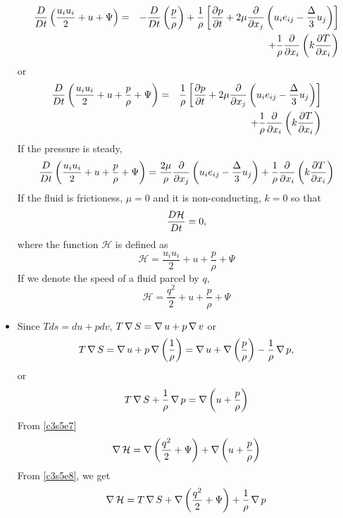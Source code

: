 \begin{itemize}
\begin{eqnarray*}
\frac{D}{Dt}\left(\frac{u_iu_i}{2} + u + \Psi\right) &=& 
-\frac{D}{Dt}\left(\frac{p}{\rho}\right) + \frac{1}{\rho}\left[\frac{\partial{p}}{\partial{t}} + 2\mu\frac{\partial}{\partial x_j}\left(u_ie_{ij} -\frac{\Delta}{3} u_j\right)\right] \\
 & & + \frac{1}{\rho}\frac{\partial}{\partial x_i}\left(k\frac{\partial{T}}{\partial{x_i}}\right)
\end{eqnarray*}
or
\begin{eqnarray*}
\frac{D}{Dt}\left(\frac{u_iu_i}{2} + u + \frac{p}{\rho} + \Psi\right) &=& 
\frac{1}{\rho}\left[\frac{\partial{p}}{\partial{t}} + 2\mu\frac{\partial}{\partial x_j}\left(u_ie_{ij} -\frac{\Delta}{3} u_j\right)\right] \\
 & & + \frac{1}{\rho}\frac{\partial}{\partial x_i}\left(k\frac{\partial{T}}{\partial{x_i}}\right)
\end{eqnarray*}
If the pressure is steady,
\begin{equation}\label{c3s5e4}
\frac{D}{Dt}\left(\frac{u_iu_i}{2} + u + \frac{p}{\rho} + \Psi\right) = \frac{2\mu}{\rho}\frac{\partial}{\partial x_j}\left(u_ie_{ij} -\frac{\Delta}{3} u_j\right) +
\frac{1}{\rho}\frac{\partial}{\partial x_i}\left(k\frac{\partial{T}}{\partial{x_i}}\right)
\end{equation}
If the fluid is frictioness, $\mu = 0$ and it is non-conducting, $k = 0$ so that
\begin{equation}\label{c3s5e5}
\frac{D{\mathcal{H}}}{Dt} = 0,
\end{equation}
where the function $\mathcal{H}$ is defined as
\begin{equation}\label{c3s5e6}
\mathcal{H} = \frac{u_iu_i}{2} + u + \frac{p}{\rho} + \Psi
\end{equation}
If we denote the speed of a fluid parcel by $q$,
\begin{equation}\label{c3s5e7}
\mathcal{H} = \frac{q^2}{2} + u + \frac{p}{\rho} + \Psi
\end{equation}

\item Since $Tds = du + pdv$, $T\operatorname{\nabla} S = \operatorname{\nabla} u + p\operatorname{\nabla}{v}$ or
\[
T\operatorname{\nabla} S = \operatorname{\nabla} u + p\operatorname{\nabla}\left(\frac{1}{\rho}\right) = \operatorname{\nabla} u + \operatorname{\nabla}\left(\frac{p}{\rho}\right) - \frac{1}{\rho}\operatorname{\nabla} p,
\]
or
\begin{equation}\label{c3s5e8}
T\operatorname{\nabla} S + \frac{1}{\rho}\operatorname{\nabla} p = \operatorname{\nabla}\left(u + \frac{p}{\rho}\right)
\end{equation}
From \eqref{c3s5e7}
\[
\operatorname{\nabla}\mathcal{H} = \operatorname{\nabla}\left(\frac{q^2}{2} + \Psi\right) + \operatorname{\nabla}\left(u + \frac{p}{\rho}\right)
\]
From \eqref{c3s5e8}, we get
\begin{equation}\label{c3s5e9}
\operatorname{\nabla}\mathcal{H} = T\operatorname{\nabla} S + \operatorname{\nabla}\left(\frac{q^2}{2} + \Psi\right) + \frac{1}{\rho}\operatorname{\nabla} p
\end{equation}


\end{itemize}
